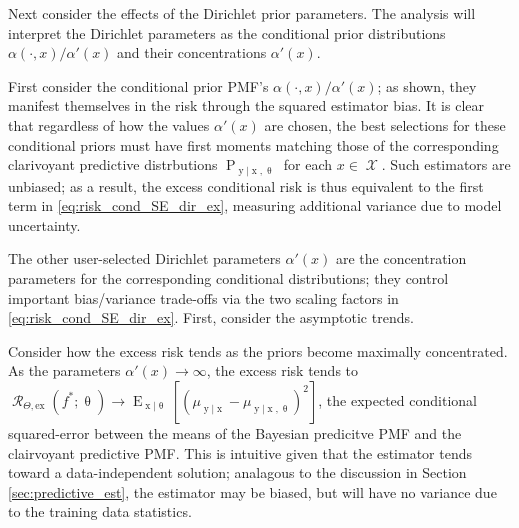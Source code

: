 \documentclass[12pt]{report}
\DeclareMathOperator{\xrm}{\mathrm{x}}
\DeclareMathOperator{\yrm}{\mathrm{y}}
\DeclareMathOperator{\Prm}{\mathrm{P}}
\DeclareMathOperator{\Erm}{\mathrm{E}}
\DeclareMathOperator{\Xcal}{\mathcal{X}}
\DeclareMathOperator{\Rcal}{\mathcal{R}}
\begin{document}
Next consider the effects of the Dirichlet prior parameters. The analysis will interpret the Dirichlet parameters as the conditional prior distributions $\alpha(\cdot,x)/\alpha'(x)$ and their concentrations $\alpha'(x)$. 

First consider the conditional prior PMF's $\alpha(\cdot,x) / \alpha'(x)$; as shown, they manifest themselves in the risk through the squared estimator bias. It is clear that regardless of how the values $\alpha'(x)$ are chosen, the best selections for these conditional priors must have first moments matching those of the corresponding clarivoyant predictive distrbutions $\Prm_{\yrm | \xrm,\uptheta}$ for each $x \in \Xcal$. Such estimators are unbiased; as a result, the excess conditional risk is thus equivalent to the first term in \eqref{eq:risk_cond_SE_dir_ex}, measuring additional variance due to model uncertainty.



The other user-selected Dirichlet parameters $\alpha'(x)$ are the concentration parameters for the corresponding conditional distributions; they control important bias/variance trade-offs via the two scaling factors in \eqref{eq:risk_cond_SE_dir_ex}. First, consider the asymptotic trends.

Consider how the excess risk tends as the priors become maximally concentrated. As the parameters $\alpha'(x) \to \infty$, the excess risk tends to $\Rcal_{\Theta, \mathrm{ex}}(f^* ; \uptheta) \to \Erm_{\xrm | \uptheta}\left[ \left( \mu_{\yrm | \xrm} - \mu_{\yrm | \xrm,\uptheta} \right)^2 \right]$, the expected conditional squared-error between the means of the Bayesian predicitve PMF and the clairvoyant predictive PMF. This is intuitive given that the estimator tends toward a data-independent solution; analagous to the discussion in Section \ref{sec:predictive_est}, the estimator may be biased, but will have no variance due to the training data statistics.
\end{document}
